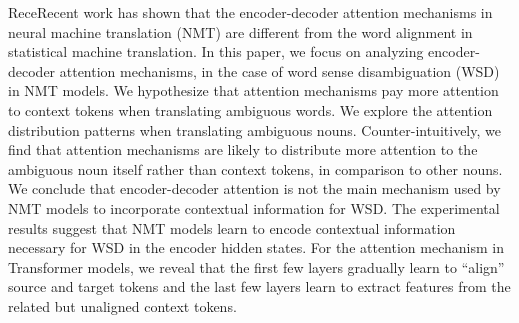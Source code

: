 ReceRecent work has shown that the encoder-decoder attention mechanisms in neural machine translation (NMT) are different from the word alignment in statistical machine translation. In this paper, we focus on analyzing encoder-decoder attention mechanisms, in the case of word sense disambiguation (WSD) in NMT models. We hypothesize that attention mechanisms pay more attention to context tokens when translating ambiguous words. We explore the attention distribution patterns when translating ambiguous nouns. Counter-intuitively, we find that attention mechanisms are likely to distribute more attention to the ambiguous noun itself rather than context tokens, in comparison to other nouns. We conclude that encoder-decoder attention is not the main mechanism used by NMT models to incorporate contextual information for WSD. The experimental results suggest that NMT models learn to encode contextual information necessary for WSD in the encoder hidden states. For the attention mechanism in Transformer models, we reveal that the first few layers gradually learn to ``align'' source and target tokens and the last few layers learn to extract features from the related but unaligned context tokens.
